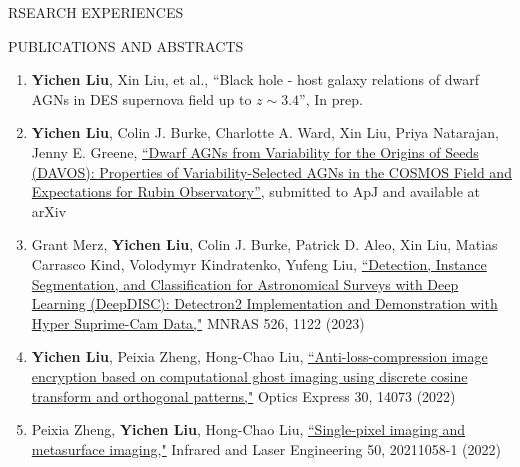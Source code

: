 \documentclass[11pt]{article} %
\begin{document}
\begin{section}{RSEARCH EXPERIENCES}
\end{section}

\begin{section}{PUBLICATIONS AND ABSTRACTS}



\begin{enumerate}[leftmargin=1.5em]
    \item \label{inprep}\textbf{Yichen Liu}, Xin Liu, et al., ``Black hole - host galaxy relations of dwarf AGNs in DES supernova field up to $z\sim3.4$'', In prep.
    \item \label{apj} \textbf{Yichen Liu}, Colin J. Burke, Charlotte A. Ward, Xin Liu, Priya Natarajan, Jenny E. Greene, \href{https://arxiv.org/abs/2402.06882}{``Dwarf AGNs from Variability for the Origins of Seeds (DAVOS): Properties of Variability-Selected AGNs in the COSMOS Field and Expectations for Rubin Observatory''}, submitted to ApJ and available at arXiv
    \item \label{mnras} Grant Merz, \textbf{Yichen Liu}, Colin J. Burke, Patrick D. Aleo, Xin Liu, Matias Carrasco Kind, Volodymyr Kindratenko, Yufeng Liu, \href{https://academic.oup.com/mnras/advance-article-abstract/doi/10.1093/mnras/stad2785/7273850?redirectedFrom=fulltext}{``Detection, Instance Segmentation, and Classification for Astronomical Surveys with Deep Learning (DeepDISC): Detectron2 Implementation and Demonstration with Hyper Suprime-Cam Data,"} MNRAS 526, 1122 (2023)
    \item \label{oe} \textbf{Yichen Liu}, Peixia Zheng, Hong-Chao Liu, \href{https://opg.optica.org/oe/fulltext.cfm?uri=oe-30-9-14073&id=471300}{``Anti-loss-compression image encryption based on computational ghost imaging using discrete cosine transform and orthogonal patterns,"} Optics Express 30, 14073 (2022)
    \item \label{irla} Peixia Zheng, \textbf{Yichen Liu}, Hong-Chao Liu, \href{http://www.irla.cn/cn/article/doi/10.3788/IRLA20211058}{``Single-pixel imaging and metasurface imaging,"} Infrared and Laser Engineering 50, 20211058-1 (2022)  
\end{enumerate}

\end{section}
\end{document}

